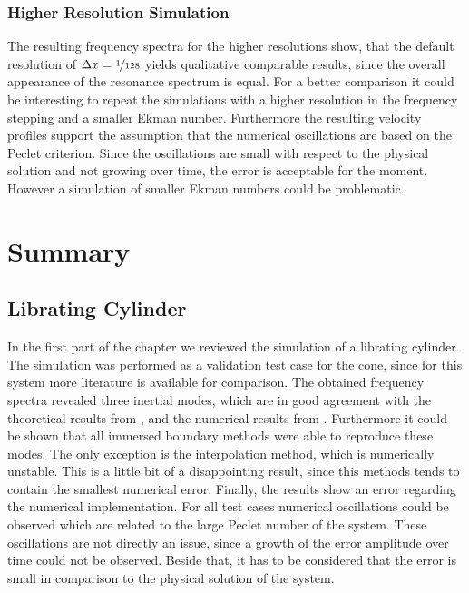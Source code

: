 \subsubsection{Higher Resolution Simulation}

The resulting frequency spectra for the higher resolutions show,
that the default resolution of ${\Delta x = \nicefrac{1}{128}}$ yields
qualitative comparable results, since the overall appearance of the resonance spectrum
is equal.
For a better comparison it could be interesting to repeat the simulations with a
higher resolution in the frequency stepping and a smaller Ekman number.
Furthermore the resulting velocity profiles support the assumption
that the numerical oscillations are based on the Peclet criterion.
Since the oscillations are small with respect to the physical solution and not
growing over time, the error is acceptable for the moment.
However a simulation of smaller Ekman numbers could be problematic.
\clearpage

\section{Summary}

\subsection{Librating Cylinder}


In the first part of the chapter we reviewed the simulation of a librating cylinder.
The simulation was performed as a validation test case for the cone,
since for this system more literature is available for comparison.
The obtained frequency spectra revealed three inertial modes,
which are in good agreement with the theoretical results from \citep{Greenspan1990},  and the  numerical results from \citep{Sauret2012}.
Furthermore it could be shown that all immersed boundary methods were able to reproduce these modes.
The only exception is the interpolation method, which is numerically unstable.
This is a little bit of a disappointing result, since this methods tends to contain
the smallest numerical error.
Finally, the results show an error regarding the numerical implementation.
For all test cases numerical oscillations could be observed which are related to the
large Peclet number of the system.
These oscillations are not directly an issue, since a growth of the error amplitude over time could not be observed.
Beside that, it has to be considered that the error is small in comparison to the physical solution of the system.

